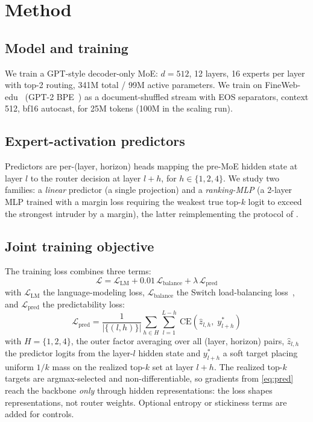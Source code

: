 \documentclass[10pt,letterpaper]{article}
\newcommand{\calL}{\mathcal{L}}
\begin{document}
\section{Method}
\label{sec:method}

\subsection{Model and training}
\label{sec:model}

We train a GPT-style decoder-only MoE: $d{=}512$, 12 layers, 16 experts per layer with top-2 routing, 341M total / 99M active parameters. We train on FineWeb-edu~\citep{penedo2024fineweb} (GPT-2 BPE~\citep{radford2019gpt2}) as a document-shuffled stream with EOS separators, context 512, bf16 autocast, for 25M tokens (100M in the scaling run).

\subsection{Expert-activation predictors}
\label{sec:predictor}

Predictors are per-(layer, horizon) heads mapping the pre-MoE hidden state at layer $l$ to the router decision at layer $l{+}h$, for $h \in \{1,2,4\}$. We study two families: a \emph{linear} predictor (a single projection) and a \emph{ranking-MLP} (a 2-layer MLP trained with a margin loss requiring the weakest true top-$k$ logit to exceed the strongest intruder by a margin), the latter reimplementing the protocol of \citet{zhu2025preattention}.

\subsection{Joint training objective}
\label{sec:objective}

The training loss combines three terms:
\begin{equation}
  \calL = \calL_{\mathrm{LM}} + 0.01\,\calL_{\mathrm{balance}} + \lambda\,\calL_{\mathrm{pred}}
  \label{eq:joint}
\end{equation}
with $\calL_{\mathrm{LM}}$ the language-modeling loss, $\calL_{\mathrm{balance}}$ the Switch load-balancing loss~\citep{fedus2021switch}, and $\calL_{\mathrm{pred}}$ the predictability loss:
\begin{equation}
  \calL_{\mathrm{pred}} = \frac{1}{|\{(l,h)\}|}\sum_{h \in H}\sum_{l=1}^{L-h}\ \mathrm{CE}\!\left(\hat{z}_{l,h},\; y^{*}_{l+h}\right)
  \label{eq:pred}
\end{equation}
with $H{=}\{1,2,4\}$, the outer factor averaging over all (layer, horizon)
pairs, $\hat{z}_{l,h}$ the predictor logits from the layer-$l$ hidden state and $y^{*}_{l+h}$ a soft target placing uniform $1/k$ mass on the realized top-$k$ set at layer $l{+}h$. The realized top-$k$ targets are argmax-selected and non-differentiable, so gradients from \cref{eq:pred} reach the backbone \emph{only} through hidden representations: the loss shapes representations, not router weights. Optional entropy or stickiness terms are added for controls.
\end{document}
